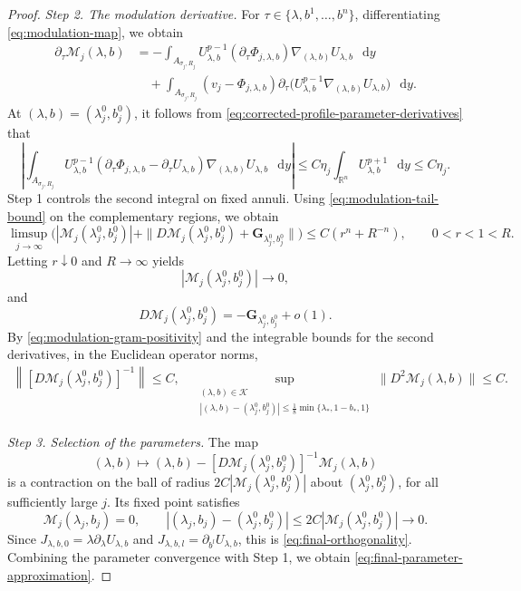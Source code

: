 \documentclass[11pt]{article}
\numberwithin{equation}{section}
\theoremstyle{remark}
\newcommand{\R}{\mathbb R}
\newcommand{\dd}{\mathop{}\!\mathrm{d}}
\begin{document}
\begin{proof}
\emph{Step 2. The modulation derivative.}
{For \(\tau\in\{\lambda,b^1,\ldots,b^n\}\), differentiating
\eqref{eq:modulation-map}, we obtain}
\[
 \begin{aligned}
 \partial_\tau\mathcal M_j(\lambda,b)
 &=-\int_{A_{\sigma_j,R_j}}
 U_{\lambda,b}^{p-1}(\partial_\tau\Phi_{j,\lambda,b})
 \nabla_{(\lambda,b)}U_{\lambda,b}\,\dd y\\
 &\quad+\int_{A_{\sigma_j,R_j}}
 (v_j-\Phi_{j,\lambda,b})
 \partial_\tau\bigl(U_{\lambda,b}^{p-1}
 \nabla_{(\lambda,b)}U_{\lambda,b}\bigr)\,\dd y.
 \end{aligned}
\]
{At \((\lambda,b)=(\lambda_j^0,b_j^0)\), it follows from
\eqref{eq:corrected-profile-parameter-derivatives} that}
 {
\[
 \left|\int_{A_{\sigma_j,R_j}}U_{\lambda,b}^{p-1}
 (\partial_\tau\Phi_{j,\lambda,b}-\partial_\tau U_{\lambda,b})
 \nabla_{(\lambda,b)}U_{\lambda,b}\,\dd y\right|
 \le C\eta_j\int_{\R^n}U_{\lambda,b}^{p+1}\,\dd y
 \le C\eta_j.
\]
}
Step  1 controls the second integral on fixed annuli.
{Using \eqref{eq:modulation-tail-bound} on the complementary
regions, we obtain}
 {
\[
 \limsup_{j\to\infty}\bigl(
 |\mathcal M_j(\lambda_j^0,b_j^0)|
 +\|D\mathcal M_j(\lambda_j^0,b_j^0)
       +\mathbf G_{\lambda_j^0,b_j^0}\|\bigr)
 \le C(r^n+R^{-n}),\qquad 0<r<1<R.
\]
}
Letting \(r\downarrow0\) and \(R\to\infty\) yields
\[
 |\mathcal M_j(\lambda_j^0,b_j^0)|\to0,
\]
and
\[
 D\mathcal M_j(\lambda_j^0,b_j^0)
 =-\mathbf G_{\lambda_j^0,b_j^0}+o(1).
\]
{By \eqref{eq:modulation-gram-positivity} and the integrable
bounds for the second derivatives, in the Euclidean operator norms,}
\[
 \begin{gathered}
 \left\|[D\mathcal M_j(\lambda_j^0,b_j^0)]^{-1}\right\|\le C,\quad 
 \sup_{\substack{(\lambda,b)\in\mathcal K\\
 |(\lambda,b)-(\lambda_j^0,b_j^0)|
 \le\frac18\min\{\lambda_*,1-b_*,1\}}}
 \|D^2\mathcal M_j(\lambda,b)\|\le C.
 \end{gathered}
\]

\emph{Step 3. Selection of the parameters.}
The map
\[
 (\lambda,b)\longmapsto
 (\lambda,b)-[D\mathcal M_j(\lambda_j^0,b_j^0)]^{-1}
 \mathcal M_j(\lambda,b)
\]
is a contraction on the ball of radius
\(2C|\mathcal M_j(\lambda_j^0,b_j^0)|\) about \((\lambda_j^0,b_j^0)\),
for all sufficiently large \(j\). Its fixed point satisfies
\[
 \mathcal M_j(\lambda_j,b_j)=0,\qquad
 |(\lambda_j,b_j)-(\lambda_j^0,b_j^0)|
 \le2C|\mathcal M_j(\lambda_j^0,b_j^0)|\to0.
\]
Since \(J_{\lambda,b,0}=\lambda\partial_\lambda U_{\lambda,b}\) and
\(J_{\lambda,b,l}=\partial_{b^l}U_{\lambda,b}\), this is
\eqref{eq:final-orthogonality}.
{Combining the parameter convergence with Step  1, we obtain
\eqref{eq:final-parameter-approximation}.}
\end{proof}
\end{document}
